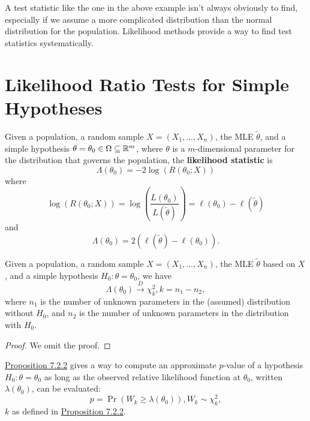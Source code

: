 \documentclass[11pt,fleqn]{book} %
\begin{document}
\begin{remark} \label{rmk:7110}
A test statistic like the one in the above example isn't always obviously to find, especially if we assume a more complicated distribution than the normal distribution for the population. Likelihood methods provide a way to find test statistics systematically.
\end{remark}


\section{Likelihood Ratio Tests for Simple Hypotheses}

\begin{definition} \label{def:721}
Given a population, a random sample \(X = (X_1, \ldots, X_n)\), the MLE \(\tilde{\theta}\), and a simple hypothesis \(\theta = \theta_0 \in \Omega \subseteq \mathbb{R}^m\), where \(\theta\) is a \(m\)-dimensional parameter for the distribution that governs the population, the \textbf{likelihood statistic} is
\[
\Lambda(\theta_0) = -2\log(R(\theta_0; X))
\]
where
\[
\log(R(\theta_0; X)) = \log\left(\frac{L(\theta_0)}{L(\tilde{\theta})}\right) = \ell(\theta_0) - \ell(\tilde{\theta})
\]
and
\[
\Lambda(\theta_0) = 2(\ell(\tilde{\theta}) - \ell(\theta_0)).
\]
\end{definition}

\begin{proposition} \label{prop:722}
Given a population, a random sample \(X = (X_1, \ldots, X_n)\), the MLE \(\tilde{\theta}\) based on \(X\), and a simple hypothesis \(H_0:\theta = \theta_0\), we have
\[
\Lambda(\theta_0) \xrightarrow{D} \chi^2_k, k = n_1 - n_2,
\]
where \(n_1\) is the number of unknown parameters in the (assumed) distribution without \(H_0\), and \(n_2\) is the number of unknown parameters in the distribution with \(H_0\).
\end{proposition}
\begin{proof} We omit the proof.\end{proof}

\begin{remark} \label{rmk:723}
\hyperref[prop:722]{Proposition 7.2.2} gives a way to compute an approximate \(p\)-value of a hypothesis \(H_0:\theta = \theta_0\) as long as the observed relative likelihood function at \(\theta_0\), written \(\lambda(\theta_0)\), can be evaluated:
\[
p = \Pr(W_k \geq \lambda(\theta_0)), W_k \sim \chi^2_k,
\]
\(k\) as defined in \hyperref[prop:722]{Proposition 7.2.2}.
\end{remark}
\end{document}
